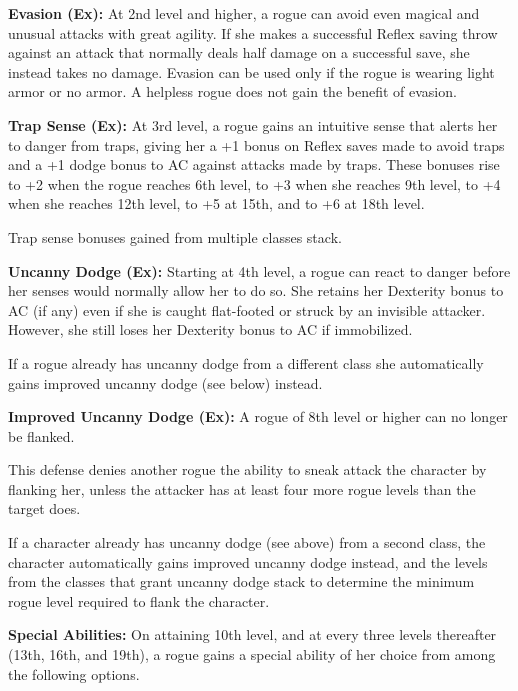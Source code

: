 \textbf{Evasion (Ex):} At 2nd level and higher, a rogue can avoid even magical and unusual attacks with great agility. If she makes a successful Reflex saving throw against an attack that normally deals half damage on a successful save, she instead takes no damage. Evasion can be used only if the rogue is wearing light armor or no armor. A helpless rogue does not gain the benefit of evasion.

\textbf{Trap Sense (Ex):} At 3rd level, a rogue gains an intuitive sense that alerts her to danger from traps, giving her a +1 bonus on Reflex saves made to avoid traps and a +1 dodge bonus to AC against attacks made by traps. These bonuses rise to +2 when the rogue reaches 6th level, to +3 when she reaches 9th level, to +4 when she reaches 12th level, to +5 at 15th, and to +6 at 18th level.

Trap sense bonuses gained from multiple classes stack.

\textbf{Uncanny Dodge (Ex):} Starting at 4th level, a rogue can react to danger before her senses would normally allow her to do so. She retains her Dexterity bonus to AC (if any) even if she is caught flat-footed or struck by an invisible attacker. However, she still loses her Dexterity bonus to AC if immobilized.

If a rogue already has uncanny dodge from a different class she automatically gains improved uncanny dodge (see below) instead.

\textbf{Improved Uncanny Dodge (Ex):} A rogue of 8th level or higher can no longer be flanked.

This defense denies another rogue the ability to sneak attack the character by flanking her, unless the attacker has at least four more rogue levels than the target does.

If a character already has uncanny dodge (see above) from a second class, the character automatically gains improved uncanny dodge instead, and the levels from the classes that grant uncanny dodge stack to determine the minimum rogue level required to flank the character.

\textbf{Special Abilities:} On attaining 10th level, and at every three levels thereafter (13th, 16th, and 19th), a rogue gains a special ability of her choice from among the following options.

